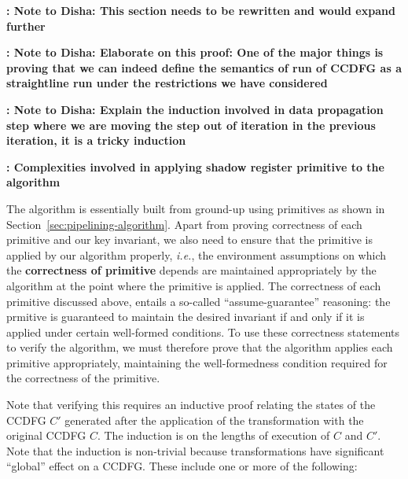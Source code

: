 {\bf: Note to Disha: This section needs to be rewritten and would expand further}

{\bf: Note to Disha: Elaborate on this proof: One of the major things is proving that we can indeed 
define the semantics of run of CCDFG as a straightline run under the restrictions we have considered}

{\bf: Note to Disha: Explain the induction involved in data propagation step where we are moving the step out of 
iteration in the previous iteration, it is a tricky induction}

{\bf: Complexities involved in applying shadow register primitive to the algorithm}

The algorithm is essentially built from ground-up using primitives
as shown in Section~\ref{sec:pipelining-algorithm}.
Apart from proving correctness of each primitive and our key invariant,
we also need to ensure that the primitive is applied by our
  algorithm properly, {\em i.e.}, the environment
  assumptions on which the {\bf correctness of primitive}
  depends are maintained appropriately by the algorithm at
  the point where the primitive is applied.  The
correctness of each primitive discussed above, entails a
so-called ``assume-guarantee'' reasoning: the prmitive is
guaranteed to maintain the desired invariant if and only if
it is applied under certain well-formed conditions.  To use
these correctness statements to verify the algorithm, we
must therefore prove that the algorithm applies each
primitive appropriately, maintaining the well-formedness
condition required for the correctness of the primitive.

Note that verifying this requires an inductive proof
relating the states of the CCDFG $C'$ generated after the
application of the transformation with the original CCDFG
$C$.  The induction is on the lengths of execution of $C$
and $C'$.  Note that the induction is non-trivial because
transformations have significant ``global'' effect on a
CCDFG.  These include one or more of the following:

